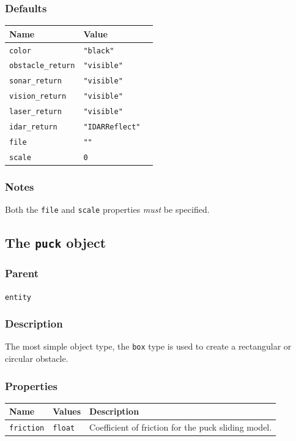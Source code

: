 \documentclass[11pt,twoside]{report}
\begin{document}
\subsubsection*{Defaults}
\begin{tabularx}{\columnwidth}{llX}
\hline
Name & Value\\
\hline
\verb'color' & \verb'"black"'\\
\verb'obstacle_return' & \verb'"visible"'\\
\verb'sonar_return' & \verb'"visible"'\\
\verb'vision_return' & \verb'"visible"'\\
\verb'laser_return' & \verb'"visible"'\\
\verb'idar_return' & \verb'"IDARReflect"'\\
\verb'file' & \verb'""' \\
\verb'scale' & \verb'0' \\
\hline
\end{tabularx}

\subsubsection*{Notes}
Both the \verb'file' and \verb'scale' properties {\em must} be
specified.



\newpage
\subsection{The {\tt puck} object}

\subsubsection*{Parent}
{\tt entity}

\subsubsection*{Description}
The most simple object type, the \verb'box' type is used to create a
rectangular or circular obstacle. 

\subsubsection*{Properties} 
\begin{tabularx}{\columnwidth}{llX}
\hline
Name & Values & Description \\
\hline
\verb'friction' & \verb'float' & Coefficient of friction for the puck sliding model.\\
\hline
\end{tabularx}
\end{document}
